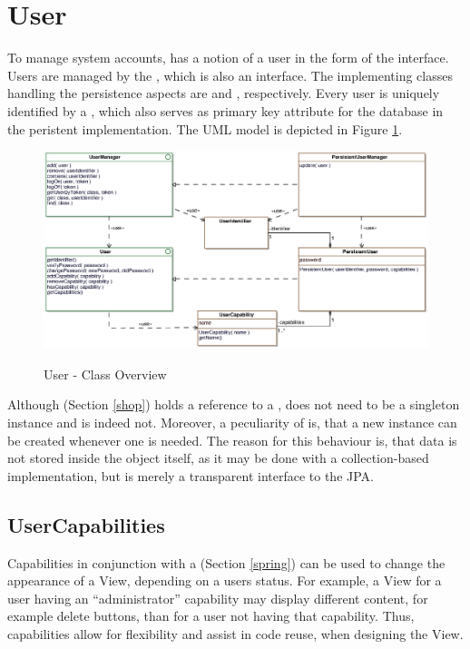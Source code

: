 \section{User}
\label{sec:user}
To manage system accounts, \salespoint{} has a notion of a user in the form of the  interface.
Users are managed by the , which is also an interface.
The implementing classes handling the persistence aspects are  and , respectively.
Every user is uniquely identified by a , which also serves as primary key attribute for the database in the peristent implementation.
The UML model is depicted in Figure \ref{user_overview}.\\

\begin{figure}
	\centering
  \includegraphics[width=1.0\textwidth]{images/User_Overview.eps}
	\label{user_overview}
	\caption{User - Class Overview}
\end{figure}

Although  (Section \ref{shop}) holds a reference to a ,  does not need to be a singleton instance and is indeed not.
Moreover, a peculiarity of  is, that a new instance can be created whenever one is needed.
The reason for this behaviour is, that data is not stored inside the  object itself, as it may be done with a collection-based implementation, but  is merely a transparent interface to the JPA.\\

\subsection*{UserCapabilities}
Capabilities in conjunction with a  (Section \ref{spring}) can be used to change the appearance of a View, depending on a users status.
For example, a View for a user having an ``administrator'' capability may display different content, for example delete buttons, than for a user not having that capability.
Thus, capabilities allow for flexibility and assist in code reuse, when designing the View.

